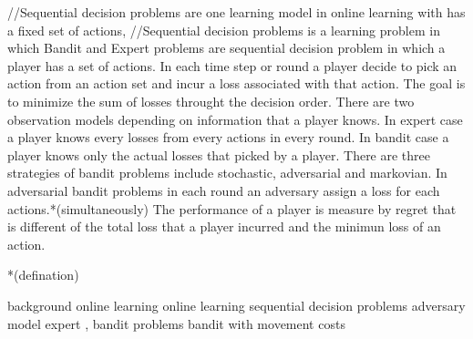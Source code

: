 \justify

//Sequential decision problems are one learning model in online learning with has a fixed set of actions, 
//Sequential decision problems is a learning problem in which 
Bandit and Expert problems are sequential decision problem in which a player has a set of actions.
In each time step or round a player decide to pick an action from an action set and incur a loss associated with that action.
The goal is to minimize the sum of losses throught the decision order.
There are two observation models depending on information that a player knows.
In expert case a player knows every losses from every actions in every round.
In bandit case a player knows only the actual losses that picked by a player.
There are three strategies of bandit problems include stochastic, adversarial and markovian.
In adversarial bandit problems in each round an adversary assign a loss for each actions.*(simultaneously)
The performance of a player is measure by regret that is different of the total loss that a player incurred and 
the minimun loss of an action.

*(defination)

background online learning
online learning
sequential decision problems
adversary model
expert , bandit problems
bandit with movement costs